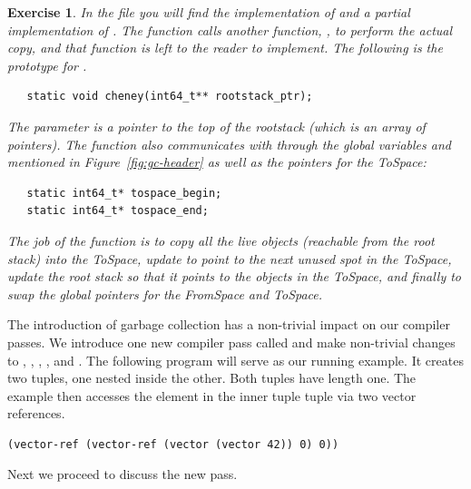 \documentclass[11pt]{book}
\newtheorem{exercise}[theorem]{Exercise}
\begin{document}
\begin{exercise}
  In the file  you will find the implementation of
   and a partial implementation of .
  The  function calls another function, ,
  to perform the actual copy, and that function is left to the reader
  to implement. The following is the prototype for .
\begin{lstlisting}
   static void cheney(int64_t** rootstack_ptr);
\end{lstlisting}
  The parameter  is a pointer to the top of the
  rootstack (which is an array of pointers).  The  function
  also communicates with  through the global
  variables  and 
  mentioned in Figure~\ref{fig:gc-header} as well as the pointers for
  the ToSpace:
\begin{lstlisting}
   static int64_t* tospace_begin;
   static int64_t* tospace_end;
\end{lstlisting}
  The job of the  function is to copy all the live
  objects (reachable from the root stack) into the ToSpace, update
   to point to the next unused spot in the ToSpace,
  update the root stack so that it points to the objects in the
  ToSpace, and finally to swap the global pointers for the FromSpace
  and ToSpace.
\end{exercise}



The introduction of garbage collection has a non-trivial impact on our
compiler passes. We introduce one new compiler pass called
 and make non-trivial changes to
, , ,
, and .  The following
program will serve as our running example.  It creates two tuples, one
nested inside the other. Both tuples have length one. The example then
accesses the element in the inner tuple tuple via two vector
references.
\begin{lstlisting}
(vector-ref (vector-ref (vector (vector 42)) 0) 0))
\end{lstlisting}

Next we proceed to discuss the new  pass.
\end{document}
